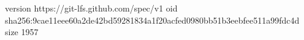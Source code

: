version https://git-lfs.github.com/spec/v1
oid sha256:9cae11eee60a2de42bd59281834a1f20acfed0980bb51b3eebfee511a99fdc4d
size 1957
